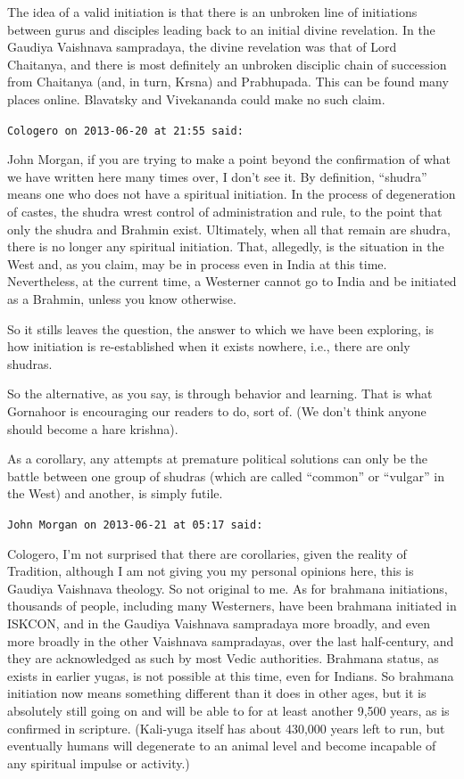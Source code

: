 \begin{footnotesize}
\begin{sffamily}
The idea of a valid initiation is that there is an unbroken line of initiations between gurus and disciples leading back to an initial divine revelation. In the Gaudiya Vaishnava sampradaya, the divine revelation was that of Lord Chaitanya, and there is most definitely an unbroken disciplic chain of succession from Chaitanya (and, in turn, Krsna) and Prabhupada. This can be found many places online. Blavatsky and Vivekananda could make no such claim.

\hfill

\texttt{Cologero on 2013-06-20 at 21:55 said:}

John Morgan, if you are trying to make a point beyond the confirmation of what we have written here many times over, I don't see it. By definition, ``shudra'' means one who does not have a spiritual initiation. In the process of degeneration of castes, the shudra wrest control of administration and rule, to the point that only the shudra and Brahmin exist. Ultimately, when all that remain are shudra, there is no longer any spiritual initiation. That, allegedly, is the situation in the West and, as you claim, may be in process even in India at this time. Nevertheless, at the current time, a Westerner cannot go to India and be initiated as a Brahmin, unless you know otherwise.

So it stills leaves the question, the answer to which we have been exploring, is how initiation is re-established when it exists nowhere, i.e., there are only shudras.

So the alternative, as you say, is through behavior and learning. That is what Gornahoor is encouraging our readers to do, sort of. (We don't think anyone should become a hare krishna).

As a corollary, any attempts at premature political solutions can only be the battle between one group of shudras (which are called ``common'' or ``vulgar'' in the West) and another, is simply futile.

\hfill

\texttt{John Morgan on 2013-06-21 at 05:17 said:}

Cologero, I'm not surprised that there are corollaries, given the reality of Tradition, although I am not giving you my personal opinions here, this is Gaudiya Vaishnava theology. So not original to me. As for brahmana initiations, thousands of people, including many Westerners, have been brahmana initiated in ISKCON, and in the Gaudiya Vaishnava sampradaya more broadly, and even more broadly in the other Vaishnava sampradayas, over the last half-century, and they are acknowledged as such by most Vedic authorities. Brahmana status, as exists in earlier yugas, is not possible at this time, even for Indians. So brahmana initiation now means something different than it does in other ages, but it is absolutely still going on and will be able to for at least another 9,500 years, as is confirmed in scripture. (Kali-yuga itself has about 430,000 years left to run, but eventually humans will degenerate to an animal level and become incapable of any spiritual impulse or activity.)


\end{sffamily}
\end{footnotesize}
